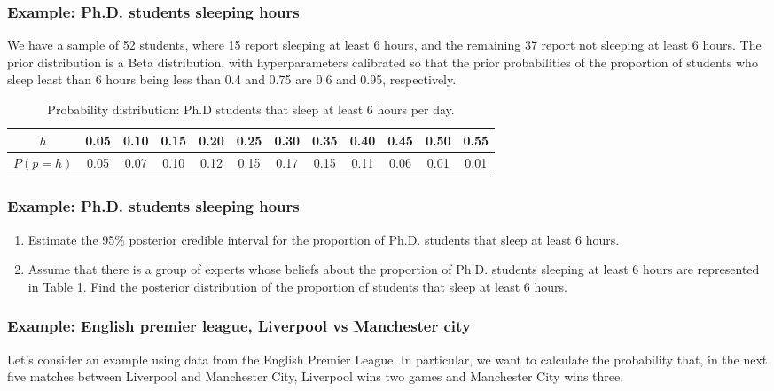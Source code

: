 \documentclass[12pt, compress]{beamer}
\begin{document}
\begin{frame}
	\frametitle{Example: Ph.D. students sleeping hours}
We have a sample of 52 students, where 15 report sleeping at least 6 hours, and the remaining 37 report not sleeping at least 6 hours. The prior distribution is a Beta distribution, with hyperparameters calibrated so that the prior probabilities of the proportion of students who sleep least than 6 hours being less than 0.4 and 0.75 are 0.6 and 0.95, respectively. 
{\tiny{
\begin{table}[!htbp]
	\caption{Probability distribution: Ph.D students that sleep at least 6 hours per day.}\label{tab:sleep}%
	\begin{tabular}{cccccccccccc}
		\hline
		$h$   & 0.05 & 0.10 & 0.15 & 0.20 & 0.25 & 0.30 & 0.35 & 0.40 & 0.45 & 0.50 & 0.55  \\
		\hline
		$P(p=h)$ & 0.05 & 0.07 & 0.10 & 0.12 & 0.15 & 0.17 & 0.15 & 0.11 & 0.06 & 0.01 & 0.01 \\ 
		\hline
	\end{tabular}
\end{table}
}}

\end{frame}


\begin{frame}
	\frametitle{Example: Ph.D. students sleeping hours}
	\begin{enumerate}
		\item Estimate the 95\% posterior credible interval for the proportion of Ph.D. students that sleep at least 6 hours.
		\item Assume that there is a group of experts whose beliefs about the proportion of Ph.D. students sleeping at least 6 hours are represented in Table \ref{tab:sleep}. Find the posterior distribution of the proportion of students that sleep at least 6 hours.  
	\end{enumerate}
\end{frame}

\begin{frame}
	\frametitle{Example: English premier league, Liverpool vs Manchester city}
	
	Let's consider an example using data from the English Premier League. In particular, we want to calculate the probability that, in the next five matches between Liverpool and Manchester City, Liverpool wins two games and Manchester City wins three.
	
\end{frame}
\end{document}
